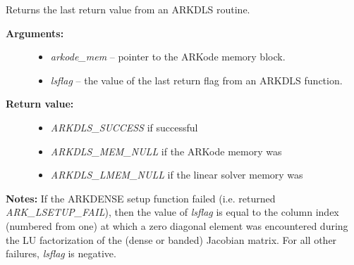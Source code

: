 \documentclass[letterpaper,10pt,english]{sphinxmanual}
\begin{document}
\begin{fulllineitems}
\label{c_interface/User_callable:ARKDlsGetLastFlag}
Returns the last return value from an ARKDLS routine.
\begin{description}
\item[{\textbf{Arguments:}}] \leavevmode\begin{itemize}
\item {} 
\emph{arkode\_mem} -- pointer to the ARKode memory block.

\item {} 
\emph{lsflag} -- the value of the last return flag from an ARKDLS function.

\end{itemize}

\item[{\textbf{Return value:}}] \leavevmode\begin{itemize}
\item {} 
\emph{ARKDLS\_SUCCESS} if successful

\item {} 
\emph{ARKDLS\_MEM\_NULL} if the ARKode memory was 

\item {} 
\emph{ARKDLS\_LMEM\_NULL} if the linear solver memory was 

\end{itemize}

\end{description}

\textbf{Notes:} If the ARKDENSE setup function failed
(i.e. {\hyperref[c_interface/User_callable:ARKode]{}} returned \emph{ARK\_LSETUP\_FAIL}), then the
value of \emph{lsflag} is equal to the column index (numbered from
one) at which a zero diagonal element was encountered during the LU
factorization of the (dense or banded) Jacobian matrix.  For all
other failures, \emph{lsflag} is negative.

\end{fulllineitems}

\end{document}
